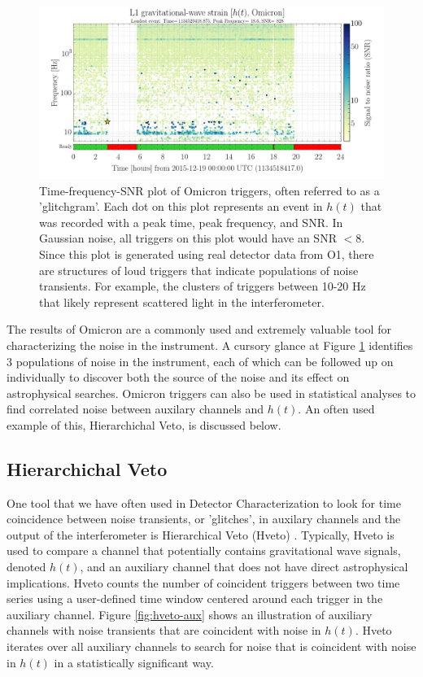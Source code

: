 \begin{figure}[ht!]
\includegraphics[width=\textwidth]{figures/detchar/Omicron-Dec19}
\caption[Omicron time-frequency-SNR plot]{Time-frequency-SNR plot of Omicron triggers, %
         often referred to as a 'glitchgram'. Each dot on this plot represents an %
         event in $h(t)$ that was recorded with a peak time, peak frequency, and SNR. %
         In Gaussian noise, all triggers on %
         this plot would have an SNR $< 8$. Since this plot is generated using real %
         detector data from O1, there are structures of loud triggers that indicate %
         populations of noise transients. For example, the clusters of triggers %
         between 10-20 Hz that likely represent scattered light in the interferometer. %
         }
\label{fig:glitchgram}
\end{figure}

The results of Omicron are a commonly used and extremely valuable tool 
for characterizing the noise in the instrument. A cursory glance at 
Figure \ref{fig:glitchgram} identifies 3 populations of noise in 
the instrument, each of which can be followed up on individually 
to discover both the source of the noise and its effect on astrophysical 
searches. Omicron triggers can also be used in statistical analyses to 
find correlated noise between auxilary channels and $h(t)$. An often used 
example of this, Hierarchichal Veto, is discussed below. 

\subsection{Hierarchichal Veto}

One tool that we have often used in Detector Characterization to look 
for time coincidence between noise transients, or 'glitches', in auxilary 
channels and the output of the interferometer is Hierarchical Veto (Hveto) 
\cite{Smith:2011}. 
Typically, Hveto is used to compare a channel that potentially contains 
gravitational wave signals, denoted $h(t)$, and an auxiliary channel 
that does not have direct astrophysical implications. Hveto counts 
the number of coincident triggers between two time series using a 
user-defined time window centered around each trigger in the auxiliary 
channel. 
Figure \ref{fig:hveto-aux} shows an illustration of auxiliary channels 
with noise transients that are coincident with noise in $h(t)$. Hveto 
iterates over all auxiliary channels to search for noise that is coincident 
with noise in $h(t)$ in a statistically significant way.

